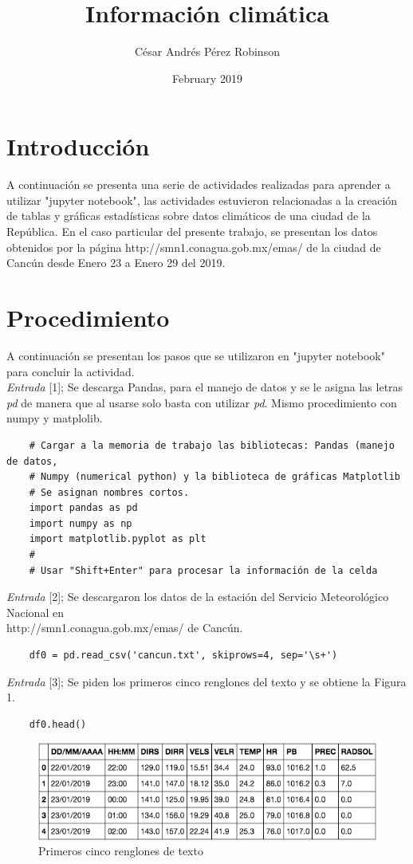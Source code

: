 \documentclass[11pt, spanish]{report}
\title{Información climática}
\author{César Andrés Pérez Robinson }
\date{February 2019}
\begin{document}
\maketitle

\section{Introducción}
A continuación se presenta una serie de actividades realizadas para aprender a utilizar "jupyter notebook", las actividades estuvieron relacionadas a la creación de tablas y gráficas estadísticas sobre datos climáticos de una ciudad de la República. En el caso particular del presente trabajo, se presentan los datos obtenidos por la página http://smn1.conagua.gob.mx/emas/ de la ciudad de Cancún desde Enero 23 a Enero 29 del 2019. 
\section{Procedimiento}
A continuación se presentan los pasos que se utilizaron en "jupyter notebook" para concluir la actividad. \\
\emph{Entrada} [1]; Se descarga Pandas, para el manejo de datos y se le asigna las letras \emph{pd} de manera que al usarse solo basta con utilizar \emph{pd}. Mismo procedimiento con numpy y matplolib.
\begin{verbatim}
    # Cargar a la memoria de trabajo las bibliotecas: Pandas (manejo de datos, 
    # Numpy (numerical python) y la biblioteca de gráficas Matplotlib
    # Se asignan nombres cortos.
    import pandas as pd
    import numpy as np
    import matplotlib.pyplot as plt
    #
    # Usar "Shift+Enter" para procesar la información de la celda
\end{verbatim}

\emph{Entrada} [2]; Se descargaron los datos de la estación del Servicio Meteorológico Nacional en \\ http://smn1.conagua.gob.mx/emas/ de Cancún.
\begin{verbatim}
    df0 = pd.read_csv('cancun.txt', skiprows=4, sep='\s+')
\end{verbatim}

\emph{Entrada} [3]; Se piden los primeros cinco renglones del texto y se obtiene la Figura 1.  
\begin{verbatim}
    df0.head()
\end{verbatim}
\begin{figure}[h]
\caption{Primeros cinco renglones de texto}
\centering
\includegraphics[width=\textwidth]{primeros5.png}
\end{figure}
\end{document}
